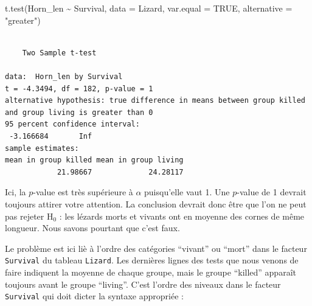 \documentclass[
  french,
  a4paper,
  DIV=11,
  numbers=noendperiod,
  oneside]{scrreprt}
\newenvironment{Shaded}{}{}
\newcommand{\AttributeTok}[1]{\textcolor[rgb]{0.84,0.23,0.29}{#1}}
\newcommand{\ConstantTok}[1]{\textcolor[rgb]{0.00,0.36,0.77}{#1}}
\newcommand{\FunctionTok}[1]{\textcolor[rgb]{0.44,0.26,0.76}{#1}}
\newcommand{\NormalTok}[1]{\textcolor[rgb]{0.14,0.16,0.18}{#1}}
\newcommand{\SpecialCharTok}[1]{\textcolor[rgb]{0.00,0.36,0.77}{#1}}
\newcommand{\StringTok}[1]{\textcolor[rgb]{0.01,0.18,0.38}{#1}}
\begin{document}
\begin{Shaded}
\begin{Highlighting}[]
\FunctionTok{t.test}\NormalTok{(Horn\_len }\SpecialCharTok{\textasciitilde{}}\NormalTok{ Survival, }\AttributeTok{data =}\NormalTok{ Lizard, }\AttributeTok{var.equal =} \ConstantTok{TRUE}\NormalTok{,}
       \AttributeTok{alternative =} \StringTok{"greater"}\NormalTok{)}
\end{Highlighting}
\end{Shaded}

\begin{verbatim}

    Two Sample t-test

data:  Horn_len by Survival
t = -4.3494, df = 182, p-value = 1
alternative hypothesis: true difference in means between group killed and group living is greater than 0
95 percent confidence interval:
 -3.166684       Inf
sample estimates:
mean in group killed mean in group living 
            21.98667             24.28117 
\end{verbatim}

Ici, la \(p\)-value est très supérieure à \(\alpha\) puisqu'elle vaut 1.
Une \(p\)-value de 1 devrait toujours attirer votre attention. La
conclusion devrait donc être que l'on ne peut pas rejeter H\(_0\) : les
lézards morts et vivants ont en moyenne des cornes de même longueur.
Nous savons pourtant que c'est faux.

Le problème est ici liè à l'ordre des catégories ``vivant'' ou ``mort''
dans le facteur \texttt{Survival} du tableau \texttt{Lizard}. Les
dernières lignes des tests que nous venons de faire indiquent la moyenne
de chaque groupe, mais le groupe ``killed'' apparaît toujours avant le
groupe ``living''. C'est l'ordre des niveaux dans le facteur
\texttt{Survival} qui doit dicter la syntaxe appropriée :

\begin{Shaded}
\end{Shaded}
\end{document}
